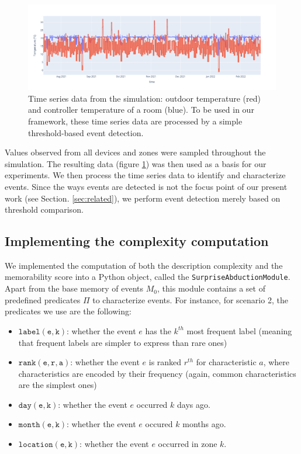 \documentclass[entropy,article,submit,moreauthors,pdftex]{Definitions/mdpi}
\begin{document}
\begin{figure}[!ht]
    \includegraphics[width=\linewidth]{figures/ts_example}
    \caption{Time series data from the simulation: outdoor temperature (red) and
        controller temperature of a room (blue). To be used in our framework, these time series data are
        processed by a simple threshold-based event detection.}
    \label{fig:ts_example}
\end{figure}

Values observed from all devices and zones were sampled throughout
the simulation. The resulting data (figure
\ref{fig:ts_example}) was then used as a basis for our experiments.
We then process the time series data to identify and characterize events.
Since the ways events are detected is not the focus point of our present work (see Section.
\ref{sec:related}), we perform event detection merely based on threshold comparison.


\subsection{Implementing the complexity computation}

We implemented the computation of both the description complexity and the memorability score into a Python object, called the \texttt{SurpriseAbductionModule}. Apart from the base memory of events $M_0$, this module contains a set of predefined predicates $\Pi$ to characterize events. For instance, for scenario 2, the predicates we use are the following:
\begin{itemize}
    \item $\mathtt{label(e, k)}$: whether the event $e$ has the $k^{th}$ most frequent label (meaning that frequent labels are simpler to express than rare ones)
    \item $\mathtt{rank(e, r, a)}$: whether the event $e$ is ranked $r^{th}$ for characteristic $a$, where characteristics are encoded by their frequency (again, common characteristics are the simplest ones)
    \item $\mathtt{day(e, k)}$: whether the event $e$ occurred $k$ days ago.
    \item $\mathtt{month(e, k)}$: whether the event $e$ occured $k$ months ago.
    \item $\mathtt{location(e, k)}$: whether the event $e$ occurred in zone
          $k$.
\end{itemize}
\end{document}
